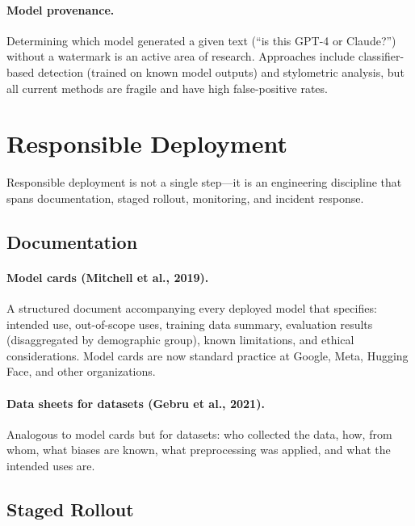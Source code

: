 \paragraph{Model provenance.}
Determining which model generated a given text (``is this GPT-4 or Claude?'')
without a watermark is an active area of research.  Approaches include
classifier-based detection (trained on known model outputs) and stylometric
analysis, but all current methods are fragile and have high false-positive
rates.

\section{Responsible Deployment}
\label{sec:responsible_deployment}

Responsible deployment is not a single step---it is an engineering discipline
that spans documentation, staged rollout, monitoring, and incident response.

\subsection{Documentation}

\paragraph{Model cards (Mitchell et al., 2019).}
A structured document accompanying every deployed model that specifies:
intended use, out-of-scope uses, training data summary, evaluation results
(disaggregated by demographic group), known limitations, and ethical
considerations.  Model cards are now standard practice at Google, Meta,
Hugging Face, and other organizations.

\paragraph{Data sheets for datasets (Gebru et al., 2021).}
Analogous to model cards but for datasets: who collected the data, how, from
whom, what biases are known, what preprocessing was applied, and what the
intended uses are.

\subsection{Staged Rollout}

